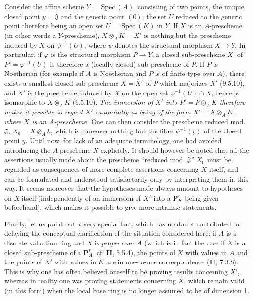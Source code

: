 \begin{env}[3.7.2]
Consider the affine scheme $Y=\operatorname{Spec}(A)$, consisting of two
points, the unique
closed point $y=\mathfrak{J}$ and the generic point $(0)$, the set $U$ reduced
to the generic point therefore being an open set $U=\operatorname{Spec}(K)$ in
$Y$. If $X$ is an $A$-prescheme (in other words a $Y$-prescheme),
$X\otimes_A K=X'$ is nothing but the prescheme induced by $X$ on
$\psi^{-1}(U)$, where $\psi$ denotes the structural morphism $X\to Y$. In
particular, if $\varphi$ is the structural morphism $P\to Y$, a
closed sub-prescheme $X'$ of $P'=\varphi^{-1}(U)$ is therefore a (locally
closed) sub-prescheme of $P$. If $P$ is Noetherian (for example if $A$ is
Noetherian and $P$ is of finite type over $A$), there exists a smallest
closed sub-prescheme $X=\overline{X}'$ of $P$ which majorizes $X'$ (9.5.10),
and $X'$ is the prescheme induced by $X$ on the open set
$\varphi^{-1}(U)\cap X$, hence is isomorphic to $X\otimes_A K$ (9.5.10).
\emph{The immersion of $X'$ into $P'=P\otimes_A K$ therefore makes it possible
to regard $X'$ canonically as being of the form $X'=X\otimes_A K$, where
$X$ is an $A$-prescheme.} One can then consider the prescheme reduced mod.
$\mathfrak{J}$, $X_0=X\otimes_A k$, which is moreover nothing but the fibre
$\psi^{-1}(y)$ of the closed point $y$. Until now, for lack of an adequate
terminology, one had avoided introducing the $A$-prescheme $X$ explicitly. It
should however be noted that all the assertions usually made
about the prescheme ``reduced mod. $\mathfrak{J}$'' $X_0$ must be regarded
as consequences of more complete assertions concerning $X$ itself, and
can be formulated and understood satisfactorily only by
interpreting them in this way. It seems moreover that the hypotheses made always
amount to hypotheses on $X$ itself (independently of an immersion of $X'$ into
a $\mathbf{P}_K^r$ being given beforehand), which makes it possible to
give more intrinsic statements.
\end{env}

\begin{env}[3.7.3]
\label{I.3.7.3}
Finally, let us point out a very special fact, which has no doubt contributed
to delaying the conceptual clarification of the situation considered here: if
$A$ is a discrete valuation ring and $X$ is \emph{proper} over $A$
(which is in fact the case if $X$ is a closed sub-prescheme of a
$\mathbf{P}_A^r$, cf. \textbf{II}, 5.5.4), the points of $X$ with values in $A$ and the
points of $X'$ with values in $K$ are in one-to-one correspondence
(\textbf{II}, 7.3.8). This is why one has often believed oneself to be proving results
concerning $X'$, whereas in reality one was proving statements concerning
$X$, which remain valid (in this form) when the local base ring is no longer
assumed to be of dimension 1.
\end{env}
